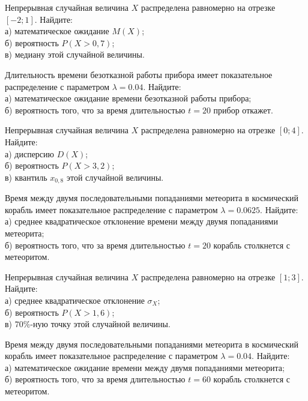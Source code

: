 \vfill

\newpage\setcounter{zad}{0}

\z Непрерывная случайная величина $X$ распределена равномерно на отрезке $[-2; 1]$. Найдите: \\ \quad а) математическое ожидание $M(X)$; \\ \quad б) вероятность $P(X>0{,}7)$; \\ \quad в) медиану этой случайной величины.


\vfill

\z Длительность времени безотказной работы прибора имеет показательное распределение с параметром $\lambda = 0.04$. Найдите: \\ \quad а) математическое ожидание времени безотказной работы прибора; \\ \quad б) вероятность того, что за время длительностью $t = 20$ прибор  откажет.
 

\vfill

\newpage\setcounter{zad}{0}

\z Непрерывная случайная величина $X$ распределена равномерно на отрезке $[0; 4]$. Найдите: \\ \quad а) дисперсию $D(X)$; \\ \quad б) вероятность $P(X>3{,}2)$; \\ \quad в) квантиль $x_{0{,}8}$ этой случайной величины.


\vfill

\z Время между двумя последовательными попаданиями метеорита в космический корабль имеет показательное распределение с параметром $\lambda = 0.0625$. Найдите: \\ \quad а) среднее квадратическое отклонение времени между двумя попаданиями метеорита; \\ \quad б) вероятность того, что за время длительностью $t = 20$ корабль  столкнется с метеоритом.
 

\vfill

\newpage\setcounter{zad}{0}

\z Непрерывная случайная величина $X$ распределена равномерно на отрезке $[1; 3]$. Найдите: \\ \quad а) среднее квадратическое отклонение $\sigma_X$; \\ \quad б) вероятность $P(X>1{,}6)$; \\ \quad в) $70\%$-ную точку этой случайной величины.


\vfill

\z Время между двумя последовательными попаданиями метеорита в космический корабль имеет показательное распределение с параметром $\lambda = 0.04$. Найдите: \\ \quad а) математическое ожидание времени между двумя попаданиями метеорита; \\ \quad б) вероятность того, что за время длительностью $t = 60$ корабль  столкнется с метеоритом.
 


